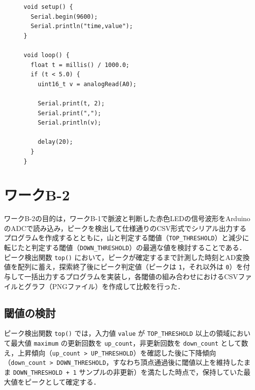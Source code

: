 \begin{figure}[H]
  \begin{lstlisting}[caption=b1\_signal\_check.ino, label=b1_signal_check, escapechar=\@]
void setup() {
  Serial.begin(9600);
  Serial.println("time,value");
}

void loop() {
  float t = millis() / 1000.0;
  if (t < 5.0) {
    uint16_t v = analogRead(A0);

    Serial.print(t, 2);
    Serial.print(",");
    Serial.println(v);

    delay(20);
  }
}
    \end{lstlisting}
\end{figure}


\section{ワークB-2}
ワークB-2の目的は，ワークB-1で脈波と判断した赤色LEDの信号波形をArduinoのADCで読み込み，ピークを検出して仕様通りのCSV形式でシリアル出力するプログラムを作成するとともに，山と判定する閾値（\texttt{TOP\_THRESHOLD}）と減少に転じたと判定する閾値（\texttt{DOWN\_THRESHOLD}）の最適な値を検討することである．
ピーク検出関数 \texttt{top()} において，ピークが確定するまで計測した時刻とAD変換値を配列に蓄え，探索終了後にピーク判定値（ピークは \texttt{1}，それ以外は \texttt{0}）を付与して一括出力するプログラムを実装し，各閾値の組み合わせにおけるCSVファイルとグラフ（PNGファイル）を作成して比較を行った．

\subsection{閾値の検討}

ピーク検出関数 \texttt{top()} では，入力値 \texttt{value} が \texttt{TOP\_THRESHOLD} 以上の領域において最大値 \texttt{maximum} の更新回数を \texttt{up\_count}，非更新回数を \texttt{down\_count} として数え，上昇傾向（\texttt{up\_count > UP\_THRESHOLD}）を確認した後に下降傾向（\texttt{down\_count > DOWN\_THRESHOLD}，すなわち頂点通過後に閾値以上を維持したまま \texttt{DOWN\_THRESHOLD + 1} サンプルの非更新）を満たした時点で，保持していた最大値をピークとして確定する．

